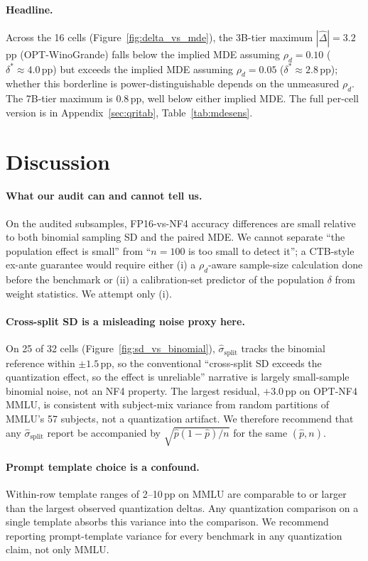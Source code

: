 \documentclass{article}
\begin{document}
\paragraph{Headline.}
Across the 16 cells (Figure~\ref{fig:delta_vs_mde}), the 3B-tier maximum $|\hat\Delta|{=}3.2$\,pp (OPT-WinoGrande) falls below the implied MDE assuming $\rho_d{=}0.10$ ($\delta^*{\approx}4.0$\,pp) but exceeds the implied MDE assuming $\rho_d{=}0.05$ ($\delta^*{\approx}2.8$\,pp); whether this borderline is power-distinguishable depends on the unmeasured $\rho_d$. The 7B-tier maximum is $0.8$\,pp, well below either implied MDE. The full per-cell version is in Appendix~\ref{sec:qritab}, Table~\ref{tab:mdesens}.

\section{Discussion}

\paragraph{What our audit can and cannot tell us.}
On the audited subsamples, FP16-vs-NF4 accuracy differences are small relative to both binomial sampling SD and the paired MDE. We cannot separate ``the population effect is small'' from ``$n{=}100$ is too small to detect it''; a CTB-style ex-ante guarantee would require either (i) a $\rho_d$-aware sample-size calculation done before the benchmark or (ii) a calibration-set predictor of the population $\delta$ from weight statistics. We attempt only (i).

\paragraph{Cross-split SD is a misleading noise proxy here.}
On 25 of 32 cells (Figure~\ref{fig:sd_vs_binomial}), $\hat\sigma_{\text{split}}$ tracks the binomial reference within $\pm 1.5$\,pp, so the conventional ``cross-split SD exceeds the quantization effect, so the effect is unreliable'' narrative is largely small-sample binomial noise, not an NF4 property. The largest residual, $+3.0$\,pp on OPT-NF4 MMLU, is consistent with subject-mix variance from random partitions of MMLU's 57 subjects, not a quantization artifact. We therefore recommend that any $\hat\sigma_{\text{split}}$ report be accompanied by $\sqrt{\hat p(1-\hat p)/n}$ for the same $(\hat p, n)$.

\paragraph{Prompt template choice is a confound.}
Within-row template ranges of 2--10\,pp on MMLU are comparable to or larger than the largest observed quantization deltas. Any quantization comparison on a single template absorbs this variance into the comparison. We recommend reporting prompt-template variance for every benchmark in any quantization claim, not only MMLU.
\end{document}
